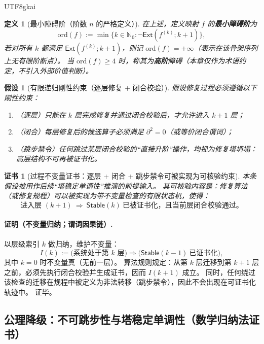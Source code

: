 \documentclass[12pt]{article}
\newtheorem{definition}{定义}[section]
\newtheorem{assumption}{假设}[section]
\newtheorem{Certificate}{证书}[section]
\newcommand{\NN}{\mathbb{N}}
\newcommand{\KouJing}{\texorpdfstring{表述约定}{表述约定}}
\begin{document}
\begin{CJK*}{UTF8}{gkai}
\begin{definition}[最小障碍阶（阶数 $n$ 的严格定义）]
在上述，定义映射 $f$ 的\textbf{最小障碍阶}为
\[
  \mathrm{ord}(f):=\min\bigl\{k\in\NN_0:\neg\mathsf{Ext}(f^{(k)};k{+}1)\bigr\},
\]
若对所有 $k$ 都满足 $\mathsf{Ext}(f^{(k)};k{+}1)$，则记 $\mathrm{ord}(f)=+\infty$（表示在该骨架序列上无有限阶断点）。
当 $\mathrm{ord}(f)\ge 4$ 时，称其为\textbf{高阶}障碍（本章仅作为术语约定，不引入外部价值判断）。
\end{definition}

\begin{assumption}[有限递归刚性约束（逐层修复 + 闭合校验）]
\label{asm:tex29-ch17-finite-recursion}
假设修复过程必须遵循以下刚性约束：
\begin{enumerate}
  \item （逐层）只能在 $k$ 层完成修复并通过闭合校验后，才允许进入 $k{+}1$ 层；
  \item （闭合）每层修复后的候选算子必须满足 $\partial^2=0$（或等价闭合谓词）；
  \item （跳步禁令）任何跳过某层闭合校验的“直接升阶”操作，均视为修复塔坍塌：高层结构不可再被证书化。
\end{enumerate}
\end{assumption}

\begin{Certificate}[过程不变量证书：逐层 + 闭合 + 跳步禁令可被实现为可核验约束]
\label{cert:tex29-ch17-finite-recursion}
本条假设被用作后续“塔稳定单调性”推演的前提输入。
其可核验内容是：修复算法（或修复规程）可以被实现为带不变量检查的有限状态机，使得：
\[
  \text{进入层 }(k{+}1)\ \Longrightarrow\ \mathsf{Stable}(k)\ \text{已被证书化，且当前层闭合校验通过。}
\]
\end{Certificate}

\paragraph{证明（不变量归纳；谓词因果链）.}
以层级索引 $k$ 做归纳，维护不变量：
\[
  I(k):=\bigl(\text{系统处于第 $k$ 层}\bigr)\Rightarrow\bigl(\mathsf{Stable}(k{-}1)\ \text{已证书化}\bigr),
\]
其中 $k=0$ 时不变量真（无前一层）。
算法规则规定：从第 $k$ 层迁移到第 $k{+}1$ 层之前，必须先执行闭合校验并生成证书，因而 $I(k{+}1)$ 成立。
同时，任何绕过该检查的迁移在规程中被定义为非法转移（跳步禁令），因此不会出现在可证书化轨迹中。
证毕。

\subsection{公理降级：不可跳步性与塔稳定单调性（数学归纳法证书）}
\label{subsec:tex29-ch17-no-skip}


\end{CJK*}
\end{document}
